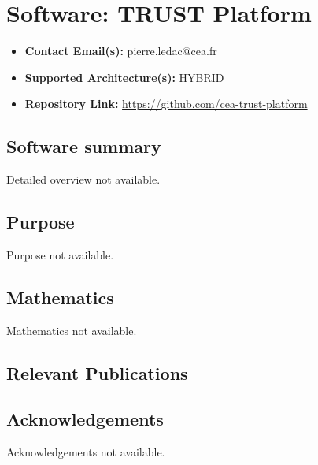 \section{Software: TRUST Platform}
\label{sec:TRUST Platform:software}



\begin{itemize}
    \item \textbf{Contact Email(s):} pierre.ledac@cea.fr
    \item \textbf{Supported Architecture(s):} HYBRID
    \item \textbf{Repository Link:} \href{https://github.com/cea-trust-platform}{https://github.com/cea-trust-platform}
\end{itemize}

\subsection{Software summary}
\label{sec:TRUST Platform:summary}
Detailed overview not available.



\subsection{Purpose}
\label{sec:TRUST Platform:purpose}
Purpose not available.



\subsection{Mathematics}
\label{sec:TRUST Platform:mathematics}
Mathematics not available.


\subsection{Relevant Publications}
\label{sec:TRUST Platform:publications}

\subsection{Acknowledgements}
\label{sec::TRUST Platform:acknowledgements}

Acknowledgements not available.


